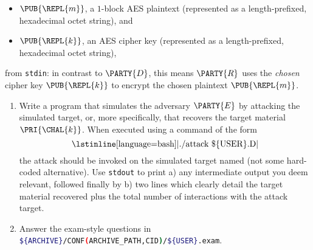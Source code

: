 \begin{itemize}
\item $\PUB{\REPL{m}}$,
      a  ${1}$-block     AES  plaintext
      (represented as a  length-prefixed, hexadecimal octet   string),
      and            
\item $\PUB{\REPL{k}}$,
      an                 AES cipher key
      (represented as a  length-prefixed, hexadecimal octet   string),
\end{itemize}

\noindent
from \lstinline[language={bash}]{stdin}:
in contrast to $\PARTY{D}$, this means $\PARTY{R}$ uses the
{\em chosen} cipher key $\PUB{\REPL{k}}$ 
to encrypt the
     chosen  plaintext  $\PUB{\REPL{m}}$.



\begin{enumerate}
\item Write a program that simulates the adversary $\PARTY{E}$ by attacking
      the simulated target, or, more specifically, that recovers the target 
      material $\PRI{\CHAL{k}}$.  
      When executed using a command of the form
      \[
      \mbox{\lstinline[language={bash}]|./attack \$\{USER\}.D|}
      \]
      the attack should be invoked on the simulated target named (not some
      hard-coded alternative).  Use \lstinline[language={bash}]{stdout} to 
      print 
      a) any intermediate output you deem relevant, followed finally by 
      b) two lines which clearly detail the target material recovered plus
         the total number of interactions with the attack target.
\item Answer the exam-style questions in 
      \lstinline[language={bash}]|${ARCHIVE}/CONF(ARCHIVE_PATH,CID)/${USER}.exam|.
\end{enumerate}


